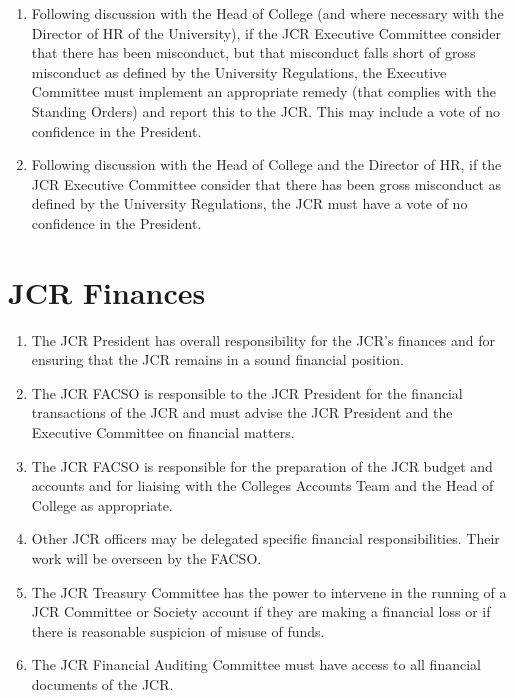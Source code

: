 \documentclass[12pt]{article}  %
\begin{document}
\begin{enumerate}
    \item Following discussion with the Head of College (and where necessary with the Director of HR of the University), if the JCR Executive Committee consider that there has been misconduct, but that misconduct falls short of gross misconduct as defined by the University Regulations, the Executive Committee must implement an appropriate remedy (that complies with the Standing Orders) and report this to the JCR. This may include a vote of no confidence in the President.
    \item Following discussion with the Head of College and the Director of HR, if the JCR Executive Committee consider that there has been gross misconduct as defined by the University Regulations, the JCR must have a vote of no confidence in the President.
\end{enumerate}
\newpage

\section{JCR Finances}
\begin{enumerate}
    \item The JCR President has overall responsibility for the JCR’s finances and for ensuring that the JCR remains in a sound financial position.
    \item The JCR FACSO is responsible to the JCR President for the financial transactions of the JCR and must advise the JCR President and the Executive Committee on financial matters.
    \item The JCR FACSO is responsible for the preparation of the JCR budget and accounts and for liaising with the Colleges Accounts Team and the Head of College as appropriate.
    \item Other JCR officers may be delegated specific financial responsibilities. Their work will be overseen by the FACSO.
    \item The JCR Treasury Committee has the power to intervene in the running of a JCR Committee or Society account if they are making a financial loss or if there is reasonable suspicion of misuse of funds.
    \item The JCR Financial Auditing Committee must have access to all financial documents of the JCR.
\end{enumerate}
\newpage
\end{document}
